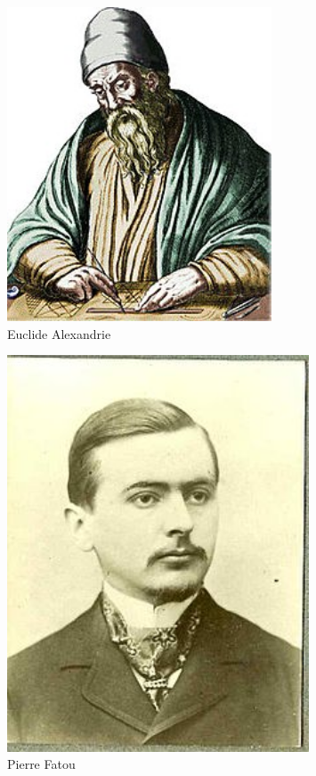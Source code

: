 \documentclass[aspectratio=1610]{beamer}
\begin{document}
\begin{frame}
\begin{minipage}[t]{0.8\textwidth}
\begin{flushleft}
\begin{itemize}
\end{itemize}
    \end{flushleft}
\end{minipage}%
\begin{minipage}[t]{0.2\textwidth}
    \begin{figure}[h]
        \centering
        \includegraphics[width=0.7\textwidth]{Euclide-Alexandrie}
    {\caption*{Euclide Alexandrie}}
        \label{fig: Euclide Alexandrie}
    \end{figure}
     \begin{figure}[h]
        \centering
        \includegraphics[width=0.8\textwidth]{Pierre_Fatou}
     {\caption*{Pierre Fatou}}
        \label{fig:Pierre Fatou}
     \end{figure}
    \end{minipage}

\end{frame}
\end{document}

